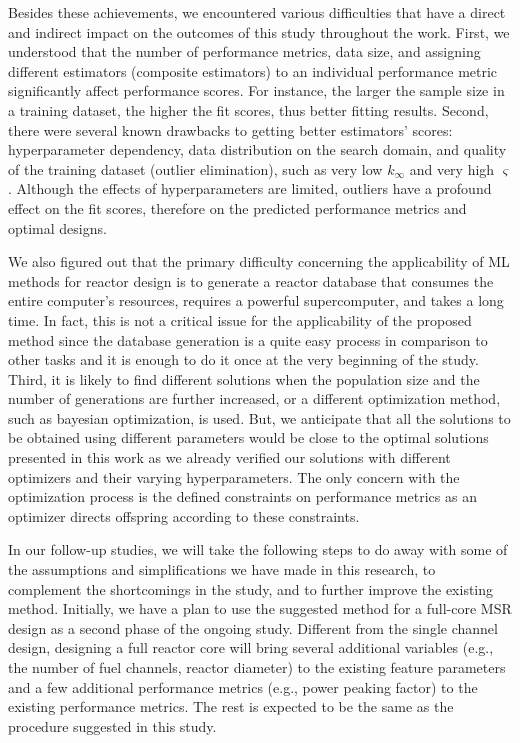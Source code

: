     Besides these achievements, we encountered various difficulties that have a direct and indirect impact on the outcomes of this study throughout the work. First, we understood that the number of performance metrics, data size, and assigning different estimators (composite estimators) to an individual performance metric significantly affect performance scores. For instance, the larger the sample size in a training dataset, the higher the fit scores, thus better fitting results. Second, there were several known drawbacks to getting better estimators' scores: hyperparameter dependency, data distribution on the search domain, and quality of the training dataset (outlier elimination), such as very low $k_{\infty}$ and very high $\varsigma$. Although the effects of hyperparameters are limited, outliers have a profound effect on the fit scores, therefore on the predicted performance metrics and optimal designs.

    We also figured out that the primary difficulty concerning the applicability of \gls{ML} methods for reactor design is to generate a reactor database that consumes the entire computer's resources, requires a powerful supercomputer, and takes a long time. In fact, this is not a critical issue for the applicability of the proposed method since the database generation is a quite easy process in comparison to other tasks and it is enough to do it once at the very beginning of the study. Third, it is likely to find different solutions when the population size and the number of generations are further increased, or a different optimization method, such as bayesian optimization, is used. But, we anticipate that all the solutions to be obtained using different parameters would be close to the optimal solutions presented in this work as we already verified our solutions with different optimizers and their varying hyperparameters. The only concern with the optimization process is the defined constraints on performance metrics as an optimizer directs offspring according to these constraints.

    In our follow-up studies, we will take the following steps to do away with some of the assumptions and simplifications we have made in this research, to complement the shortcomings in the study, and to further improve the existing method. Initially, we have a plan to use the suggested method for a full-core \gls{MSR} design as a second phase of the ongoing study. Different from the single channel design, designing a full reactor core will bring several additional variables (e.g., the number of fuel channels, reactor diameter) to the existing feature parameters and a few additional performance metrics (e.g., power peaking factor) to the existing performance metrics. The rest is expected to be the same as the procedure suggested in this study.

